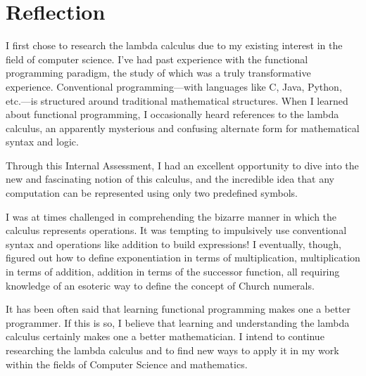 \documentclass[twocolumn,titlepage,12pt]{article}
\begin{document}
\section{Reflection}
I first chose to research the lambda calculus due to my existing interest in the field of computer science. I've had past experience with the functional programming paradigm, the study of which was a truly transformative experience. Conventional programming---with languages like C, Java, Python, etc.---is structured around traditional mathematical structures. When I learned about functional programming, I occasionally heard references to the lambda calculus, an apparently mysterious and confusing alternate form for mathematical syntax and logic.

Through this Internal Assessment, I had an excellent opportunity to dive into the new and fascinating notion of this calculus, and the incredible idea that any computation can be represented using only two predefined symbols.

I was at times challenged in comprehending the bizarre manner in which the calculus represents operations. It was tempting to impulsively use conventional syntax and operations like addition to build expressions! I eventually, though, figured out how to define exponentiation in terms of multiplication, multiplication in terms of addition, addition in terms of the successor function, all requiring knowledge of an esoteric way to define the concept of Church numerals.

It has been often said that learning functional programming makes one a better programmer. If this is so, I believe that learning and understanding the lambda calculus certainly makes one a better mathematician. I intend to continue researching the lambda calculus and to find new ways to apply it in my work within the fields of Computer Science and mathematics.


\end{document}
